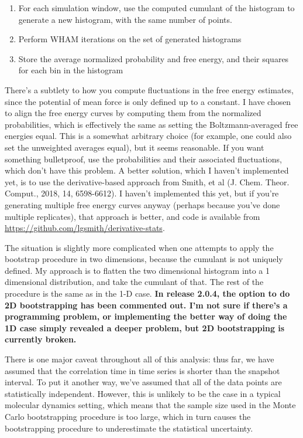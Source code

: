 \documentclass[12pt]{article}
\begin{document}
\begin{enumerate}

\item For each simulation window, use the computed cumulant of the histogram
to generate a new histogram, with the same number of points.

\item Perform WHAM iterations on the set of generated histograms

\item Store the average normalized probability and free energy, and their
squares for each bin in the histogram
\end{enumerate}

There's a subtlety to how you compute fluctuations in the free energy estimates,
since the potential of mean force is only defined up to a constant.  I have
chosen to align the free energy curves by computing them from the normalized
probabilities, which is effectively the same as setting the Boltzmann-averaged
free energies equal.  This is a somewhat arbitrary choice (for example, one
could also set the unweighted averages equal), but it seems reasonable.  If you
want something bulletproof, use the probabilities and their associated
fluctuations, which don't have this problem. A better solution, which I haven't
implemented yet, is to use the derivative-based approach from Smith, et al (J.
Chem. Theor. Comput., 2018, 14, 6598-6612). I haven't implemented this yet, but
if you're generating multiple free energy curves anyway (perhaps because you've
done multiple replicates), that approach is better, and code is available from
\url{https://github.com/lgsmith/derivative-stats}.

The situation is slightly more complicated when one attempts to apply the
bootstrap procedure in two dimensions, because the cumulant is not uniquely
defined.  My approach is to flatten the two dimensional histogram into a 1
dimensional distribution, and take the cumulant of that.  The rest of the
procedure is the same as in the 1-D case.  {\bf In release 2.0.4, the option
to do 2D bootstrapping has been commented out.  I'm not sure if there's a
programming problem, or implementing the better way of doing the 1D case
simply revealed a deeper problem, but 2D bootstrapping is currently broken.}

There is one major caveat throughout all of this analysis: thus far, we have
assumed that the correlation time in time series is shorter than the snapshot
interval.  To put it another way, we've assumed that all of the data points
are statistically independent.  However, this is unlikely to be the case in a
typical molecular dynamics setting, which means that the sample size used in
the Monte Carlo bootstrapping procedure is too large, which in turn causes
the bootstrapping procedure to underestimate the statistical uncertainty.
\end{document}
